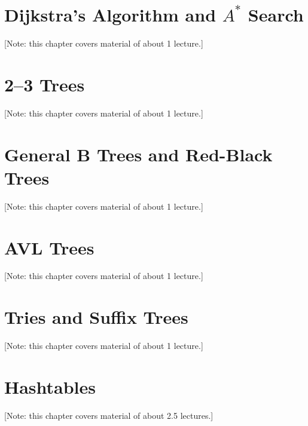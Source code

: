 \documentclass{book}
\begin{document}
\chapter{Dijkstra's Algorithm and $A^*$ Search}
\label{chap:dijkstra}
[Note: this chapter covers material of about 1 lecture.]



\chapter{2--3 Trees}
\label{chap:B-trees}
[Note: this chapter covers material of about 1 lecture.]



\chapter{General B Trees and Red-Black Trees}
\label{chap:red-black-trees}
[Note: this chapter covers material of about 1 lecture.]



\chapter{AVL Trees}
\label{chap:AVL-trees}
[Note: this chapter covers material of about 1 lecture.]



\chapter{Tries and Suffix Trees}
\label{chap:tries}
[Note: this chapter covers material of about 1 lecture.]



\chapter{Hashtables}
\label{chap:hashing}
[Note: this chapter covers material of about 2.5 lectures.]
\end{document}
